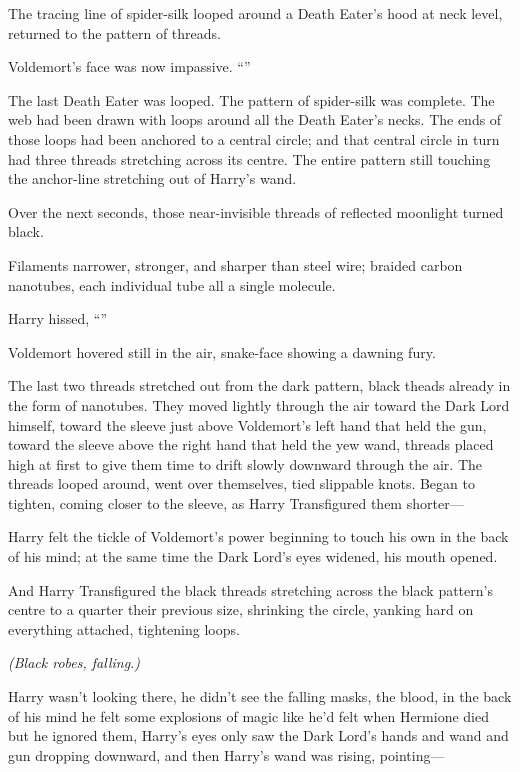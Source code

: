 The tracing line of spider-silk looped around a Death Eater’s hood at neck level, returned to the pattern of threads.

Voldemort’s face was now impassive. “”

The last Death Eater was looped. The pattern of spider-silk was complete. The web had been drawn with loops around all the Death Eater’s necks. The ends of those loops had been anchored to a central circle; and that central circle in turn had three threads stretching across its centre. The entire pattern still touching the anchor-line stretching out of Harry’s wand.

Over the next seconds, those near-invisible threads of reflected moonlight turned black.

Filaments narrower, stronger, and sharper than steel wire; braided carbon nanotubes, each individual tube all a single molecule.

Harry hissed, “”

Voldemort hovered still in the air, snake-face showing a dawning fury.

The last two threads stretched out from the dark pattern, black theads already in the form of nanotubes. They moved lightly through the air toward the Dark Lord himself, toward the sleeve just above Voldemort’s left hand that held the gun, toward the sleeve above the right hand that held the yew wand, threads placed high at first to give them time to drift slowly downward through the air. The threads looped around, went over themselves, tied slippable knots. Began to tighten, coming closer to the sleeve, as Harry Transfigured them shorter—

Harry felt the tickle of Voldemort’s power beginning to touch his own in the back of his mind; at the same time the Dark Lord’s eyes widened, his mouth opened.

And Harry Transfigured the black threads stretching across the black pattern’s centre to a quarter their previous size, shrinking the circle, yanking hard on everything attached, tightening loops.

\emph{(Black robes, falling.)}

Harry wasn’t looking there, he didn’t see the falling masks, the blood, in the back of his mind he felt some explosions of magic like he’d felt when Hermione died but he ignored them, Harry’s eyes only saw the Dark Lord’s hands and wand and gun dropping downward, and then Harry’s wand was rising, pointing—

